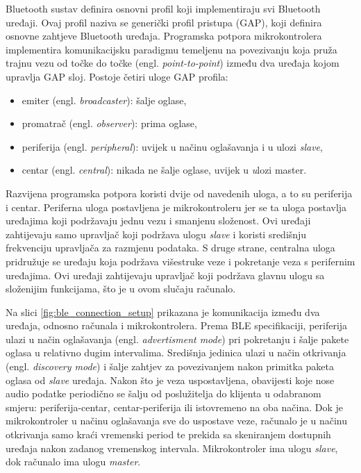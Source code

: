 Bluetooth sustav definira osnovni profil koji implementiraju svi Bluetooth uređaji. Ovaj profil naziva se generički profil pristupa (GAP), koji definira osnovne zahtjeve Bluetooth uređaja. Programska potpora mikrokontrolera implementira komunikacijsku paradigmu temeljenu na povezivanju koja pruža trajnu vezu od točke do točke (engl. \textit{point-to-point}) između dva uređaja kojom upravlja GAP sloj. Postoje četiri uloge GAP profila:
\begin{itemize}
	\item emiter (engl. \textit{broadcaster}): šalje oglase,
	\item promatrač (engl. \textit{observer}): prima oglase,
	\item periferija (engl. \textit{peripheral}): uvijek u načinu oglašavanja i u ulozi \textit{slave}, 
	\item centar (engl. \textit{central}): nikada ne šalje oglase, uvijek u \textit ulozi {master}.
\end{itemize}

Razvijena programska potpora koristi dvije od navedenih uloga, a to su periferija i centar. Periferna uloga postavljena je mikrokontroleru jer se ta uloga postavlja uređajima koji podržavaju jednu vezu i smanjenu složenost. Ovi uređaji zahtijevaju samo upravljač koji podržava ulogu \textit{slave} i koristi središnju frekvenciju upravljača za razmjenu podataka. S druge strane, centralna uloga pridružuje se uređaju koja podržava višestruke veze i pokretanje veza s perifernim uređajima. Ovi uređaji zahtijevaju upravljač koji podržava glavnu ulogu sa složenijim funkcijama, što je u ovom slučaju računalo.

Na slici \ref{fig:ble_connection_setup} prikazana je komunikacija između dva uređaja, odnosno računala i mikrokontrolera. Prema BLE specifikaciji, periferija ulazi u način oglašavanja (engl. \textit{advertisment mode}) pri pokretanju i šalje pakete oglasa u relativno dugim intervalima. Središnja jedinica ulazi u način otkrivanja (engl. \textit{discovery mode}) i šalje zahtjev za povezivanjem nakon primitka paketa oglasa od \textit{slave} uređaja. Nakon što je veza uspostavljena, obavijesti koje nose audio podatke periodično se šalju od poslužitelja do klijenta u odabranom smjeru: periferija-centar, centar-periferija ili istovremeno na oba načina. Dok je mikrokontroler u načinu oglašavanja sve do uspostave veze, računalo je u načinu otkrivanja samo kraći vremenski period te prekida sa skeniranjem dostupnih uređaja nakon zadanog vremenskog intervala. Mikrokontroler ima ulogu \textit{slave}, dok računalo ima ulogu \textit{master}. 

